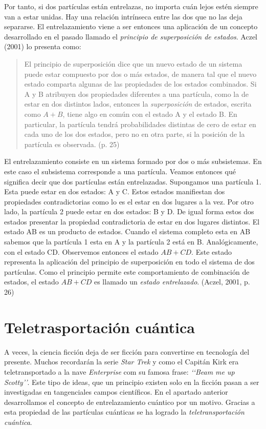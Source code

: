 \documentclass[11pt,a4paper]{article}
\begin{document}
Por tanto, si dos partículas están entrelazas, no importa cuán lejos estén siempre van a estar unidas. Hay una relación intrínseca entre las dos que no las deja separarse. El entrelazamiento viene a ser entonces una aplicación de un concepto desarrollado en el pasado llamado el \textit{principio de superposición de estados}. Aczel (2001) lo presenta como:
\begin{quote}
El principio de superposición dice que un nuevo estado de un sistema puede estar compuesto por dos o más estados, de manera tal que el nuevo estado comparta algunas de las propiedades de los estados combinados. Si A y B atribuyen dos propiedades diferentes a una partícula, como la de estar en dos distintos lados, entonces la \textit{superposición} de estados, escrita como $A + B$, tiene algo en común con el estado A y el estado B. En particular, la partícula tendrá probabilidades distintas de cero de estar en cada uno de los dos estados, pero no en otra parte, si la posición de la partícula es observada. (p. 25)
\end{quote}
El entrelazamiento consiste en un sistema formado por dos o más subsistemas. En este caso el subsistema corresponde a una partícula. Veamos entonces qué significa decir que dos partículas están entrelazadas. Supongamos una partícula 1. Esta puede estar en dos estados: A y C. Estos estados manifiestan dos propiedades contradictorias como lo es el estar en dos lugares a la vez. Por otro lado, la partícula 2 puede estar en dos estados: B y D. De igual forma estos dos estados presentar la propiedad contradictoria de estar en dos lugares distintos. El estado AB es un producto de estados. Cuando el sistema completo esta en AB sabemos que la partícula 1 esta en A y la partícula 2 está en B. Analógicamente, con el estado CD. Observemos entonces el estado $AB + CD$. Este estado representa la aplicación del principio de superposición en todo el sistema de dos partículas. Como el principio permite este comportamiento de combinación de estados, el estado $AB + CD$ es llamado un \textit{estado entrelazado}. (Aczel, 2001, p. 26)

\section*{Teletrasportación cuántica}

A veces, la ciencia ficción deja de ser ficción para convertirse en tecnología del presente. Muchos recordarán la serie \textit{Star Trek} y como el Capitán Kirk era teletransportado a la nave \textit{Enterprise} com su famosa frase: \textit{‘‘Beam me up Scotty’’}. Este tipo de ideas, que un principio existen solo en la ficción pasan a ser investigadas en tangenciales campos científicos. En el apartado anterior desarrollamos el concepto de entrelazamiento cuántico por un motivo. Gracias a esta propiedad de las partículas cuánticas se ha logrado la \textit{teletransportación cuántica}. 
\end{document}
